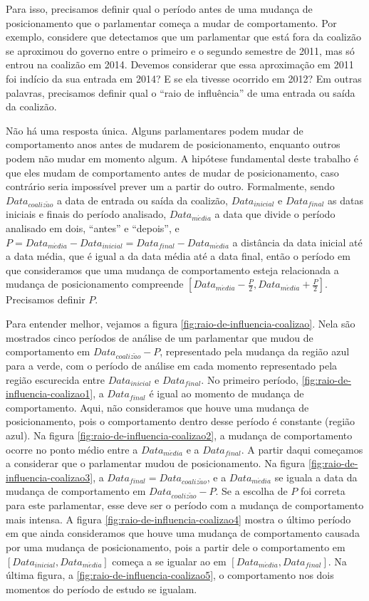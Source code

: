 \documentclass[a4paper,titlepage]{ppgi}\usepackage[]{graphicx}\usepackage[]{color}
\begin{document}
Para isso, precisamos definir qual o período antes de uma mudança de
posicionamento que o parlamentar começa a mudar de comportamento. Por exemplo,
considere que detectamos que um parlamentar que está fora da coalizão se
aproximou do governo entre o primeiro e o segundo semestre de 2011, mas só
entrou na coalizão em 2014. Devemos considerar que essa aproximação em 2011 foi
indício da sua entrada em 2014? E se ela tivesse ocorrido em 2012?  Em outras
palavras, precisamos definir qual o ``raio de influência'' de uma entrada ou
saída da coalizão.

Não há uma resposta única. Alguns parlamentares podem mudar de comportamento
anos antes de mudarem de posicionamento, enquanto outros podem não mudar em
momento algum. A hipótese fundamental deste trabalho é que eles mudam de
comportamento antes de mudar de posicionamento, caso contrário seria impossível
prever um a partir do outro. Formalmente, sendo $Data_{coaliz\tilde{a}o}$ a
data de entrada ou saída da coalizão, $Data_{inicial}$ e $Data_{final}$ as
datas iniciais e finais do período analisado, $Data_{m\acute{e}dia}$ a data que
divide o período analisado em dois, ``antes'' e ``depois'', e $P =
Data_{m\acute{e}dia} - Data_{inicial} = Data_{final} -
Data_{m\acute{e}dia}$ a distância da data inicial até a data média, que é igual
a da data média até a data final, então o período em que consideramos que uma
mudança de comportamento esteja relacionada a mudança de posicionamento
compreende $\left[Data_{m\acute{e}dia} - \frac{P}{2}, Data_{m\acute{e}dia} +
\frac{P}{2}\right]$. Precisamos definir $P$.

Para entender melhor, vejamos a figura \ref{fig:raio-de-influencia-coalizao}.
Nela são mostrados cinco períodos de análise de um parlamentar que mudou de
comportamento em $Data_{coaliz\tilde{a}o} - P$, representado pela mudança da
região azul para a verde, com o período de análise em cada momento representado
pela região escurecida entre $Data_{inicial}$ e $Data_{final}$. No primeiro
período, \ref{fig:raio-de-influencia-coalizao1}, a $Data_{final}$ é igual ao
momento de mudança de comportamento. Aqui, não consideramos que houve uma
mudança de posicionamento, pois o comportamento dentro desse período é
constante (região azul). Na figura \ref{fig:raio-de-influencia-coalizao2}, a
mudança de comportamento ocorre no ponto médio entre a $Data_{m\acute{e}dia}$ e
a $Data_{final}$. A partir daqui começamos a considerar que o parlamentar mudou
de posicionamento. Na figura \ref{fig:raio-de-influencia-coalizao3}, a
$Data_{final} = Data_{coaliz\tilde{a}o}$, e a $Data_{m\acute{e}dia}$ se iguala
a data da mudança de comportamento em $Data_{coaliz\tilde{a}o} - P$. Se a
escolha de $P$ foi correta para este parlamentar, esse deve ser o período com a
mudança de comportamento mais intensa. A figura
\ref{fig:raio-de-influencia-coalizao4} mostra o último período em que ainda
consideramos que houve uma mudança de comportamento causada por uma mudança de
posicionamento, pois a partir dele o comportamento em $\left[Data_{inicial},
Data_{m\acute{e}dia}\right]$ começa a se igualar ao em
$\left[Data_{m\acute{e}dia}, Data_{final}\right]$. Na última figura, a
\ref{fig:raio-de-influencia-coalizao5}, o comportamento nos dois momentos do
período de estudo se igualam.
\end{document}
